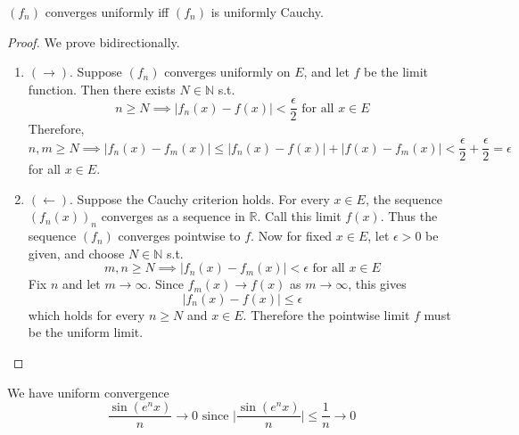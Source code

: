   \begin{lemma}
    $(f_n)$ converges uniformly iff $(f_n)$ is uniformly Cauchy. 
  \end{lemma}
  \begin{proof}
    We prove bidirectionally. 
    \begin{enumerate}
      \item $(\rightarrow)$. Suppose $(f_n)$ converges uniformly on $E$, and let $f$ be the limit function. Then there exists $N \in \mathbb{N}$ s.t. 
      \begin{equation}
        n \geq N \implies |f_n (x) - f(x)| < \frac{\epsilon}{2} \text{ for all } x \in E
      \end{equation} 
      Therefore, 
      \begin{equation}
        n, m \geq N \implies |f_n (x) - f_m (x)| \leq |f_n (x) - f(x)| + |f(x) - f_m (x)| < \frac{\epsilon}{2} + \frac{\epsilon}{2} = \epsilon 
      \end{equation}
      for all $x \in E$. 

      \item $(\leftarrow)$. Suppose the Cauchy criterion holds. For every $x \in E$, the sequence $(f_n (x))_n$ converges as a sequence in $\mathbb{R}$. Call this limit $f(x)$. Thus the sequence $(f_n)$ converges pointwise to $f$. Now for fixed $x \in E$, let $\epsilon > 0$ be given, and choose $N \in \mathbb{N}$ s.t. 
        \begin{equation}
          m, n \geq N \implies |f_n (x) - f_m (x)| < \epsilon \text{ for all } x \in E
        \end{equation} 
        Fix $n$ and let $m \to \infty$. Since $f_m (x) \to f(x)$ as $m \to \infty$, this gives 
        \begin{equation}
          |f_n (x) - f(x)| \leq \epsilon
        \end{equation}
        which holds for every $n \geq N$ and $x \in E$. Therefore the pointwise limit $f$ must be the uniform limit. 
    \end{enumerate}
  \end{proof}

  \begin{example}
    We have uniform convergence
    \begin{equation}
      \frac{\sin(e^n x)}{n} \to 0 \text{ since  } \bigg| \frac{\sin(e^n x)}{n} \bigg| \leq \frac{1}{n} \to 0
    \end{equation}
  \end{example}

